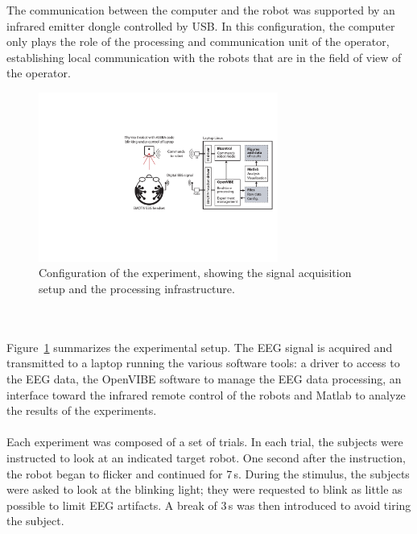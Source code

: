 \documentclass[smallextended]{svjour3}
\begin{document}
The communication between the computer and the robot was supported by an infrared emitter dongle controlled by USB. 
In this configuration, the computer only plays the role of the processing and communication unit of the operator, establishing local communication with the robots that are in the field of view of the operator.\\
\begin{figure} \center
\includegraphics[width=0.7\textwidth]{figures/schema-global.pdf}
\caption{Configuration of the experiment, showing the signal acquisition setup and the processing infrastructure.} \label{fig:thymioinstall}
\end{figure}\\
\\
Figure~\ref{fig:thymioinstall} summarizes the experimental setup. 
The EEG signal is acquired and transmitted to a laptop running the various software tools: a driver to access to the EEG data, the OpenVIBE software to manage the EEG data processing, an interface toward the infrared remote control of the robots and Matlab to analyze the results of the experiments.\\
\\
Each experiment was composed of a set of trials. In each trial, the subjects were instructed to look at an indicated target robot. 
One second after the instruction, the robot began to flicker and continued for 7\,s. During the stimulus, the subjects were asked to look at the blinking light; they were requested to blink as little as possible to limit EEG artifacts. 
A break of 3\,s was then introduced to avoid tiring the subject.
\end{document}
